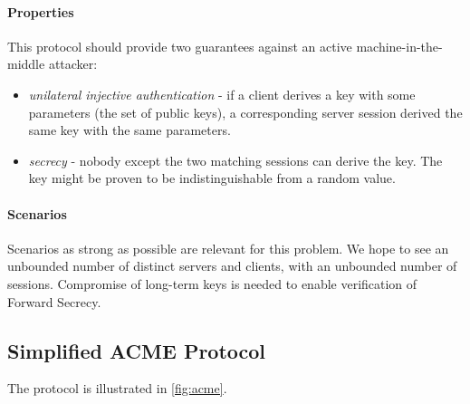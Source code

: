 \documentclass[11pt]{article}
\begin{document}
\paragraph{Properties} This protocol should provide two guarantees against an active machine-in-the-middle attacker:
\begin{itemize}
\item \emph{unilateral injective authentication} - if a client derives a key with some parameters (the set of public keys), a corresponding server session derived the same key with the same parameters.
\item \emph{secrecy} - nobody except the two matching sessions can derive the key. The key might be proven to be indistinguishable from a random value.
\end{itemize}

\paragraph{Scenarios} Scenarios as strong as possible are relevant for this problem. We hope to see an unbounded number of distinct servers and clients, with an unbounded number of sessions. Compromise of long-term keys is needed to enable verification of Forward Secrecy.  

\subsection{Simplified ACME Protocol}\label{prob:acme}

The protocol is illustrated in \cref{fig:acme}.
\end{document}
